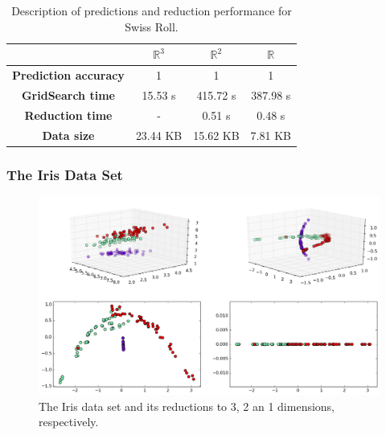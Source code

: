 \documentclass[12pt]{article}
\begin{document}
\begin{table}[H]
	\centering
	\begin{tabular}{|c|c|c|c|}
		\hline
		& \textbf{$\mathbb{R}^3$} & \textbf{$\mathbb{R}^2$} & \textbf{$\mathbb{R}$} \\\hline
		\textbf{Prediction accuracy}   & 1            & 1             & 1     \\\hline
		\textbf{GridSearch time} & 15.53 s   & 415.72 s  & 387.98 s  \\\hline
		\textbf{Reduction time}  & -         & 0.51 s       & 0.48 s     \\\hline
		\textbf{Data size}          & 23.44 KB & 15.62 KB  & 7.81 KB   \\\hline
	\end{tabular}

	\caption{Description of predictions and reduction performance for Swiss Roll.}
\end{table}

\subsubsection{The Iris Data Set}

\begin{figure}[H]
	\centering
	\includegraphics[width=\linewidth]{experiments/2_3_iris_isomap}
	\captionsetup{justification=centering}
	\caption{The Iris data set and its reductions to 3, 2 an 1 dimensions, respectively.}
\end{figure}
\end{document}
